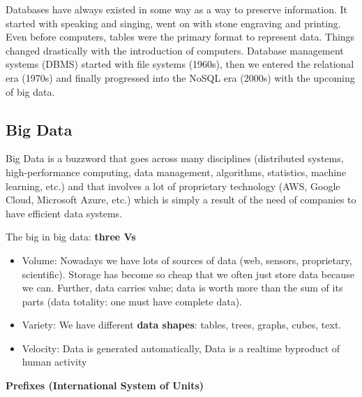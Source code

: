 \documentclass[11pt,oneside,a4paper]{article}
\begin{document}
Databases have always existed in some way as a way to preserve information. It started with speaking and singing, went on with stone engraving and printing. Even before computers, tables were the primary format to represent data. Things changed drastically with the introduction of computers. Database management systems (DBMS) started with file systems (1960s), then we entered the relational era (1970s) and finally progressed into the NoSQL era (2000s) with the upcoming of big data.

\subsection{Big Data}

Big Data is a buzzword that goes across many disciplines (distributed systems, high-performance computing, data management, algorithms, statistics, machine learning, etc.) and that involves a lot of proprietary technology (AWS, Google Cloud, Microsoft Azure, etc.) which is simply a result of the need of companies to have efficient data systems.

The big in big data: \textbf{three Vs}

\vspace{-\topsep}
\begin{itemize}
	\setlength{\itemsep}{0pt}
	\setlength{\parskip}{0pt}
	\item Volume: Nowadays we have lots of sources of data (web, sensors, proprietary, scientific). Storage has become so cheap that we often just store data because we can. Further, data carries value; data is worth more than the sum of its parts (data totality: one must have complete data).
	\item Variety: We have different \textbf{data shapes}: tables, trees, graphs, cubes, text.
	\item Velocity: Data is generated automatically, Data is a realtime byproduct of human activity
\end{itemize}

\textbf{Prefixes (International System of Units)}
\end{document}
